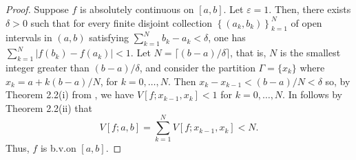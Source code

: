 \begin{proof}
Suppose $f$ is absolutely continuous on $[a,b]$. Let $\varepsilon=
1$. Then, there exists $\delta>0$ such that for every finite disjoint
collection $\left\{(a_k,b_k)\right\}_{k=1}^N$ of open intervals in $(a,b)$
satisfying $\sum_{k=1}^Nb_k-a_k<\delta$, one has
$\sum_{k=1}^N\left|f(b_k)-f(a_k)\right|<1$. Let
$N=\lceil(b-a)/\delta\rceil$, that is, $N$ is the smallest integer
greater than $(b-a)/\delta$, and consider the partition $\Gamma=\{x_k\}$
where $x_k= a+k(b-a)/N$, for $k=0,\dotsc,N$. Then
$x_k-x_{k-1}<(b-a)/N<\delta$ so, by Theorem 2.2(i) from \cite[Ch.\@ 2, p.\@
19]{wheeden-zygmund}, we have $V[f;x_{k-1},x_k]<1$ for $k=0,\dotsc,N$. In
follows by Theorem 2.2(ii) that
\begin{equation}
\label{eq:prep:1:14}
V[f;a,b]=\sum_{k=1}^N V[f;x_{k-1},x_k]<N.
\end{equation}
Thus, $f$ is b.v.\@ on $[a,b]$.
\end{proof}

